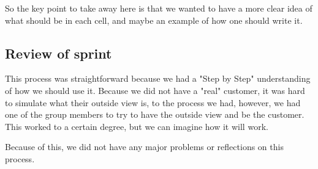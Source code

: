 So the key point to take away here is that we wanted to have a more clear idea of what should be in each cell, and maybe an example of how one should write it.

\subsection{Review of sprint}
This process was straightforward because we had a "Step by Step" understanding of how we should use it.
Because we did not have a "real" customer, it was hard to simulate what their outside view is, to the process we had, however, we had one of the group members to try to have the outside view and be the customer.
This worked to a certain degree, but we can imagine how it will work.

Because of this, we did not have any major problems or reflections on this process.

